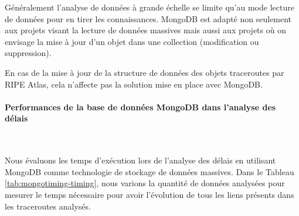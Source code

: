     Généralement l'analyse de données à grande échelle se limite qu'au mode lecture de données pour en tirer les connaissances. MongoDB est adapté non seulement aux projets visant la lecture de données massives mais aussi aux projets où on envisage la mise à jour d'un objet dans une collection (modification ou suppression). 
 
 En cas de la  mise à jour de la structure de données des objets traceroutes par RIPE Atlas,  cela n'affecte pas la solution mise en place avec MongoDB. 
 









\paragraph{Performances de la base de données MongoDB dans l'analyse des délais }~

Nous évaluons les temps d'exécution lors de l'analyse des délais en utilisant MongoDB comme technologie de stockage de données massives.  Dans le Tableau \ref{tab:mongotiming-timing}, nous varions la quantité de données analysées pour mesurer le temps nécessaire pour avoir  l'évolution de tous les liens présents dans  les traceroutes analysés. 

